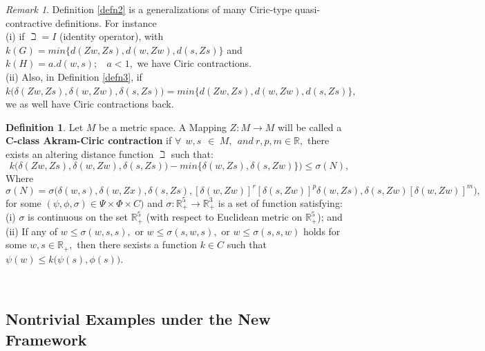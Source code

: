 \documentclass[11pt,reqno]{amsart}
\theoremstyle{definition}
\newtheorem{definition}[theorem]{Definition}
\theoremstyle{remark}
\newtheorem{remark}[theorem]{Remark}
\numberwithin{equation}{section}
\begin{document}
	\begin{remark}
		Definition \ref{defn2} is a generalizations of many Ciric-type quasi-contractive definitions. For instance\\
		(i) if $\beth =I$ (identity operator), with\\  $k(G)= min\{d(Zw,Zs), d(w,Zw), d(s, Zs)\}$ and $k(H)= a.d(w,s); ~~~~a < 1,$ we have Ciric contractions.\\
		(ii) Also, in Definition \ref{defn3},   if $k\Big( \delta(Zw,Zs), \delta(w,Zw), \delta(s, Zs)\Big) = min\{d(Zw,Zs), d(w,Zw), d(s, Zs)\},$  we as well have Ciric contractions back.\\
	\end{remark}
	\begin{definition}\label{defn6}
	Let $M$ be a metric space. A Mapping $Z: M \to M$ will be called a \textbf{C-class Akram-Ciric contraction} if $\forall~~w,s~~\in~M,~ ~and ~r,p,m \in \mathbb{R},$  there exists an altering distance function $\beth$ such that:
		\begin{equation}\label{eqn2.3}
			k\Big( \delta(Zw,Zs), \delta(w,Zw), \delta(s, Zs)\Big)- min\{\delta(w,Zs), \delta(s, Zw)\}\Big) \leq \sigma(N),
		\end{equation}
	Where $$\sigma(N) = \sigma\Big(\delta(w,s),\delta(w,Zx), \delta(s,Zs),[\delta(w,Zw)]^r[\delta(s,Zw)]^p \delta(w, Zs), \delta(s,Zw)[\delta(w,Zw)]^m\Big),$$
	for some $(\psi, \phi, \sigma) \in \Psi \times \Phi \times C)$ and $\sigma: \mathbb{R}_+^5 \to \mathbb{R}_+^3$ is a set of function satisfying:\\
	(i) $\sigma$ is continuous on the set $\mathbb{R}_+^5$ (with respect to Euclidean metric on $\mathbb{R}_+^5$); and\\
	(ii) If any of $w \leq \sigma(w,s,s),$ or $w \leq \sigma(s,w,s),$ or $w \leq \sigma(s,s,w)$ holds for some $w,s \in \mathbb{R}_+,$ then there sexists a function $k \in C$ such that $\psi (w) \leq k\Big(\psi (s), \phi (s)\Big).$
	\end{definition}
	~~~~\\
	\subsection{Nontrivial Examples under the New Framework}
	
\end{document}
